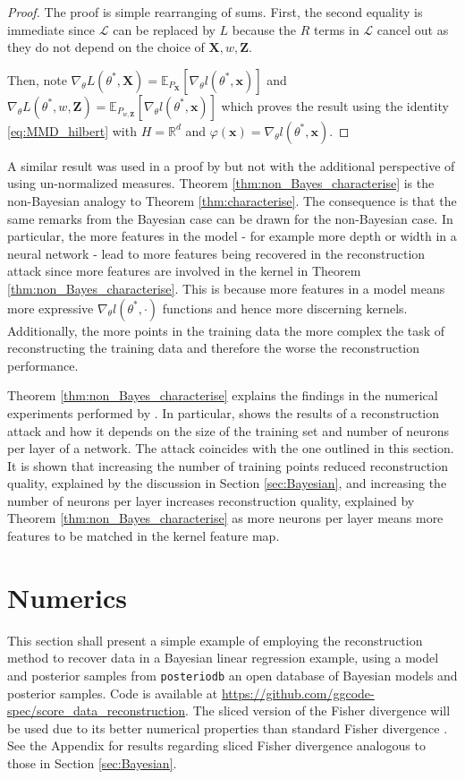 \documentclass[hyperref]{article}
\theoremstyle{plain}
\theoremstyle{remark}
\newcommand{\bx}{\mathbf{x}}
\newcommand{\bX}{\mathbf{X}}
\newcommand{\bZ}{\mathbf{Z}}
\newcommand{\bbR}{\mathbb{R}}
\newcommand{\bbE}{\mathbb{E}}
\newcommand{\calL}{\mathcal{L}}
\begin{document}
\begin{proof}
	The proof is simple rearranging of sums. First, the second equality is immediate since $\calL$ can be replaced by $L$ because the $R$ terms in $\calL$ cancel out as they do not depend on the choice of $\bX,w,\bZ$. 
	
	Then, note $\nabla_{\theta}L(\theta^{*},\bX) = \bbE_{P_{\bX}}[\nabla_{\theta}l(\theta^{*},\bx)]$ and $\nabla_{\theta}L(\theta^{*},w,\bZ) = \bbE_{P_{w,\bZ}}[\nabla_{\theta}l(\theta^{*},\bx)]$ which proves the result using the identity \eqref{eq:MMD_hilbert} with $H=\bbR^{d}$ and $\varphi(\bx) = \nabla_{\theta}l(\theta^{*},\bx)$. 
\end{proof}
A similar result was used in a proof by \citet{Loo2023} but not with the additional perspective of using un-normalized measures. Theorem \ref{thm:non_Bayes_characterise} is the non-Bayesian analogy to Theorem \ref{thm:characterise}. The consequence is that the same remarks from the Bayesian case can be drawn for the non-Bayesian case. In particular, the more features in the model - for example more depth or width in a neural network - lead to more features being recovered in the reconstruction attack since more features are involved in the kernel in Theorem \ref{thm:non_Bayes_characterise}. This is because more features in a model means more expressive $\nabla_{\theta} l(\theta^{*},\cdot)$ functions and hence more discerning kernels. Additionally, the more points in the training data the more complex the task of reconstructing the training data and therefore the worse the reconstruction performance. 

Theorem \ref{thm:non_Bayes_characterise} explains the findings in the numerical experiments performed by \citet{Haim2022,buzaglo2023deconstructing}. In particular, \citet[Figure 7]{buzaglo2023deconstructing} shows the results of a reconstruction attack and how it depends on the size of the training set and number of neurons per layer of a network. The attack coincides with the one outlined in this section. It is shown that increasing the number of training points reduced reconstruction quality, explained by the discussion in Section \ref{sec:Bayesian}, and increasing the number of neurons per layer increases reconstruction quality, explained by Theorem \ref{thm:non_Bayes_characterise} as more neurons per layer means more features to be matched in the kernel feature map. 


\section{Numerics}\label{sec:numerics}
This section shall present a simple example of employing the reconstruction method to recover data in a Bayesian linear regression example, using a model and posterior samples from \texttt{posteriodb} \citep{posteriordb} an open database of Bayesian models and posterior samples. Code is available at \url{https://github.com/ggcode-spec/score_data_reconstruction}. The sliced version of the Fisher divergence will be used due to its better numerical properties than standard Fisher divergence \citep{song2019sliced}. See the Appendix for results regarding sliced Fisher divergence analogous to those in Section \ref{sec:Bayesian}.
\end{document}
